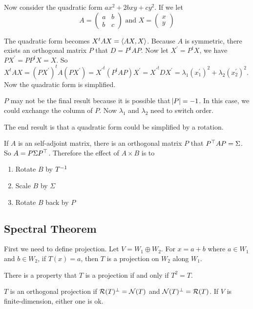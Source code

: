 \begin{example}
    Now consider the quadratic form $ax^2 + 2bxy + cy^2$. If we let 
\begin{equation}
    A = \begin{pmatrix}
        a & b \\
        b & c
    \end{pmatrix} \text{ and } X = \begin{pmatrix}
        x \\
        y
    \end{pmatrix}
\end{equation}

The quadratic form becomes $X^t A X = \left\langle \displaystyle AX, X \right\rangle$. Because $A$ is symmetric, there exists an orthogonal matrix $P$ that $D = P^t A P$. Now let $X^\prime = P^t X$, we have $PX^\prime = PP^tX = X$. So $X^t A X = (PX^\prime)^t A (PX^\prime) = {X^\prime}^t (P^t A P) X^\prime = {X^\prime}^t D X^\prime = \lambda_1 (x_1^\prime)^2 + \lambda_2 (x_2^\prime)^2$. Now the quadratic form is simplified.

$P$ may not be the final result because it is possible that $\abs{P} = -1$. In this case, we could exchange the column of $P$. Now $\lambda_1$ and $\lambda_2$ need to switch order.

The end result is that a quadratic form could be simplified by a rotation.
\end{example}

\begin{example}
    If $A$ is an self-adjoint matrix, there is an orthogonal matrix $P$ that ${P}^\top A P = \Sigma$. So $A = P \Sigma {P}^\top$. Therefore the effect of $A \times B$ is to
    \begin{enumerate}
        \item Rotate $B$ by ${T}^{-1}$
        \item Scale $B$ by $\Sigma$
        \item Rotate $B$ back by $P$
    \end{enumerate}
\end{example}



\subsection{Spectral Theorem}

\begin{definition}
    First we need to define projection. Let $V = W_1 \oplus W_2$. For $x = a + b$ where $a \in W_1$ and $b \in W_2$, if $T(x) = a$, then $T$ is a projection on $W_2$ along $W_1$.
    
    There is a property that $T$ is a projection if and only if $T^2 = T$.
    
    $T$ is an orthogonal projection if $\mathcal{R}(T)^\perp = \mathcal{N}(T)$ and $\mathcal{N}(T)^\perp = \mathcal{R}(T)$. If $V$ is finite-dimension, either one is ok.
\end{definition}

